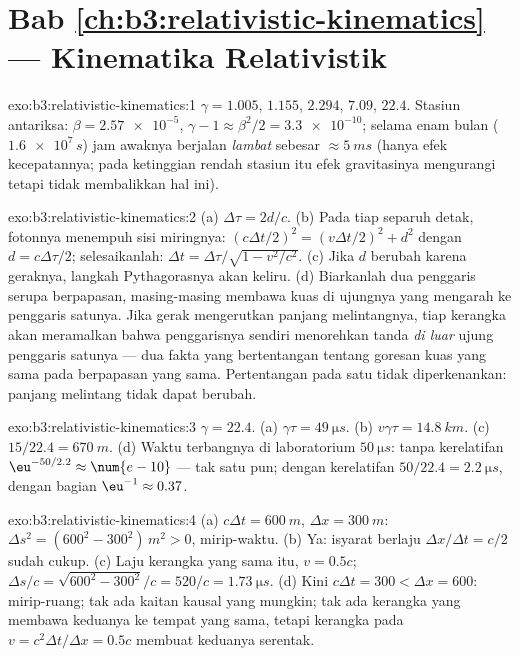 \section*{Bab \ref{ch:b3:relativistic-kinematics} --- Kinematika Relativistik}

\begin{solution}{exo:b3:relativistic-kinematics:1}
$\gamma = 1.005$, $1.155$, $2.294$, $7.09$, $22.4$. Stasiun antariksa: $\beta =
\num{2.57e-5}$, $\gamma - 1 \approx \beta^2/2 = \num{3.3e-10}$; selama
enam bulan ($\num{1.6e7}{}\,\unit{s}$) jam awaknya berjalan
\emph{lambat} sebesar $\approx\qty{5}{ms}$ (hanya efek kecepatannya;
pada ketinggian rendah stasiun itu efek gravitasinya mengurangi tetapi
tidak membalikkan hal ini).
\end{solution}

\begin{solution}{exo:b3:relativistic-kinematics:2}
(a) $\Delta\tau = 2d/c$. (b) Pada tiap separuh detak, fotonnya menempuh
sisi miringnya: $(c\Delta t/2)^2 = (v\Delta t/2)^2 + d^2$ dengan $d =
c\Delta\tau/2$; selesaikanlah: $\Delta t = \Delta\tau/\sqrt{1 - v^2/c^2}$. (c)
Jika $d$ berubah karena geraknya, langkah Pythagorasnya akan keliru. (d)
Biarkanlah dua penggaris serupa berpapasan, masing-masing membawa kuas
di ujungnya yang mengarah ke penggaris satunya. Jika gerak mengerutkan
panjang melintangnya, tiap kerangka akan meramalkan bahwa penggarisnya
sendiri menorehkan tanda \emph{di luar} ujung penggaris satunya --- dua
fakta yang bertentangan tentang goresan kuas yang sama pada 
berpapasan yang sama. Pertentangan pada satu  tidak
diperkenankan: panjang melintang tidak dapat berubah.
\end{solution}

\begin{solution}{exo:b3:relativistic-kinematics:3}
$\gamma = 22.4$. (a) $\gamma\tau = \qty{49}{\micro s}$. (b) $v\gamma
\tau = \qty{14.8}{km}$. (c) $15/22.4 = \qty{670}{m}$. (d) Waktu
terbangnya di laboratorium $\qty{50}{\micro s}$: tanpa kerelatifan
$\eu^{-50/2.2} \approx \num{e-10}$ --- tak satu pun; dengan kerelatifan
 $50/22.4 = \qty{2.2}{\micro s}$, dengan bagian $\eu^{-1}
\approx 0.37$.
\end{solution}

\begin{solution}{exo:b3:relativistic-kinematics:4}
(a) $c\Delta t = \qty{600}{m}$, $\Delta x = \qty{300}{m}$: $\Delta s^2
= (600^2 - 300^2)\,\unit{m^2} > 0$, mirip-waktu. (b) Ya: isyarat berlaju
$\Delta x/\Delta t = c/2$ sudah cukup. (c) Laju kerangka yang sama itu, $v =
0.5c$;  $\Delta s/c = \sqrt{600^2 - 300^2}/c = 520/c =
\qty{1.73}{\micro s}$. (d) Kini $c\Delta t = 300 < \Delta x = 600$:
mirip-ruang; tak ada kaitan kausal yang mungkin; tak ada kerangka yang
membawa keduanya ke tempat yang sama, tetapi kerangka pada
$v = c^2\Delta t/\Delta x = 0.5c$ membuat keduanya serentak.
\end{solution}

